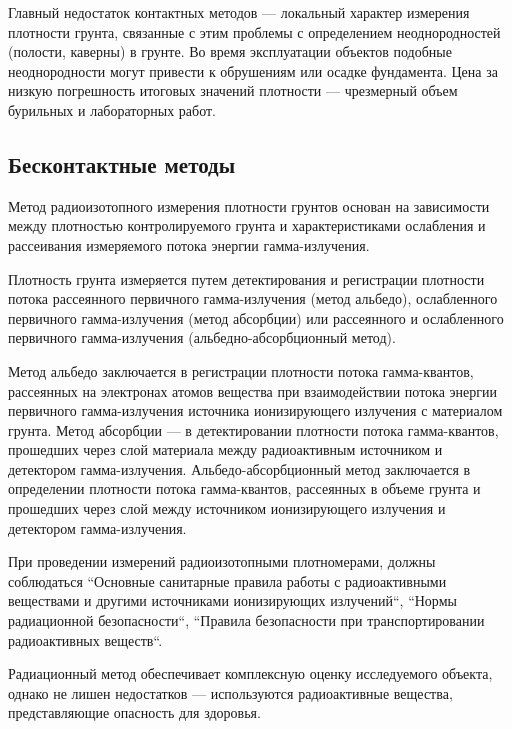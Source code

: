 Главный недостаток контактных методов --- локальный характер измерения плотности грунта, связанные с этим проблемы с определением 
неоднородностей (полости, каверны) в грунте. Во время эксплуатации объектов подобные неоднородности могут привести к обрушениям или осадке фундамента. 
Цена за низкую погрешность итоговых значений плотности --- чрезмерный объем бурильных и лабораторных работ. 

%

\subsection{Бесконтактные методы}\label{subsect1_1_2}

Метод радиоизотопного измерения плотности грунтов основан на зависимости между плотностью контролируемого 
грунта и характеристиками ослабления и рассеивания измеряемого потока энергии гамма-излучения.

Плотность грунта измеряется путем детектирования и регистрации плотности потока рассеянного первичного 
гамма-излучения (метод альбедо), ослабленного первичного гамма-излучения (метод абсорбции) или 
рассеянного и ослабленного первичного гамма-излучения (альбедно-абсорбционный метод).

Метод альбедо заключается в регистрации плотности потока гамма-квантов, рассеянных на электронах атомов 
вещества при взаимодействии потока энергии первичного гамма-излучения источника ионизирующего излучения с материалом грунта.
Метод абсорбции --- в детектировании плотности потока гамма-квантов, прошедших через слой материала 
между радиоактивным источником и детектором гамма-излучения.
Альбедо-абсорбционный метод заключается в определении плотности потока гамма-квантов, рассеянных 
в объеме грунта и прошедших через слой между источником ионизирующего излучения и детектором гамма-излучения.

При проведении измерений радиоизотопными плотномерами, должны соблюдаться ``Основные санитарные правила работы с 
радиоактивными веществами и другими источниками ионизирующих излучений``, ``Нормы радиационной безопасности``, 
``Правила безопасности при транспортировании радиоактивных веществ``.

Радиационный метод обеспечивает комплексную оценку исследуемого объекта, однако не лишен недостатков --- используются
радиоактивные вещества, представляющие опасность для здоровья.


